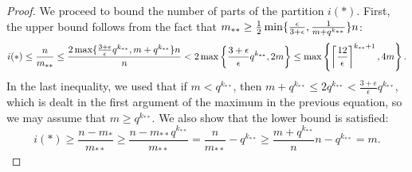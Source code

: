 \begin{theorem}
\begin{proof}
                We proceed to bound the number of parts of the partition $i(*)$.
                First, the upper bound follows from the fact that
                $m_{**} \geq \frac{1}{2} \min \{ \frac{\epsilon} {3 + \epsilon}, \frac{1}{m + q^{k_{**}}} \} n$:
                \[
                    i(*) \leq \frac{n}{m_{**}} \leq \frac{2 \max \{ \frac{3 + \epsilon}{\epsilon} q^{k_{**}}, m + q^{k_{**}} \}n}{n}
                         < 2 \max \left\{ \frac{3 + \epsilon}{\epsilon} q^{k_{**}}, 2m \right\}
                         \leq \max \left\{ \left\lceil \frac{12}{\epsilon} \right\rceil^{k_{**}+1}, 4m \right\}.
                \]
                In the last inequality, we used that if $m < q^{k_{**}}$, then $m + q^{k_{**}} \leq 2q^{k_{**}} < \frac{3 + \epsilon}{\epsilon} q^{k_{**}}$,
                which is dealt in the first argument of the maximum in the previous equation, so we may assume that $m \geq q^{k_{**}}$.
                We also show that the lower bound is satisfied:
                \[
                    i(*) \geq \frac{n - m_*}{m_{**}}
                         \geq \frac{n - m_{**}q^{k_{**}}}{m_{**}}
                         = \frac{n}{m_{**}} - q^{k_{**}}
                         \geq \frac{m + q^{k_{**}}}{n} n - q^{k_{**}}
                         = m.
                \]
            \end{proof}
        \end{theorem}

